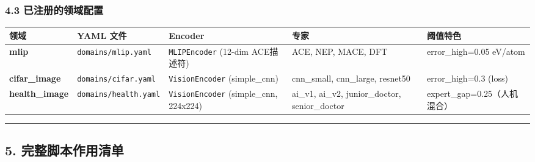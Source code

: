 \documentclass[
  12pt,
]{ctexart}
\begin{document}
\subsubsection{4.3
已注册的领域配置}\label{ux5df2ux6ce8ux518cux7684ux9886ux57dfux914dux7f6e}

\begin{longtable}[]{@{}
  >{\raggedright\arraybackslash}p{}
  >{\raggedright\arraybackslash}p{}
  >{\raggedright\arraybackslash}p{}
  >{\raggedright\arraybackslash}p{}
  >{\raggedright\arraybackslash}p{}@{}}
\toprule\noalign{}
\begin{minipage}[b]{\linewidth}\raggedright
领域
\end{minipage} & \begin{minipage}[b]{\linewidth}\raggedright
YAML 文件
\end{minipage} & \begin{minipage}[b]{\linewidth}\raggedright
Encoder
\end{minipage} & \begin{minipage}[b]{\linewidth}\raggedright
专家
\end{minipage} & \begin{minipage}[b]{\linewidth}\raggedright
阈值特色
\end{minipage} \\
\midrule\noalign{}
\endhead
\bottomrule\noalign{}
\endlastfoot
\textbf{mlip} & \texttt{domains/mlip.yaml} & \texttt{MLIPEncoder}
(12-dim ACE描述符) & ACE, NEP, MACE, DFT & error\_high=0.05 eV/atom \\
\textbf{cifar\_image} & \texttt{domains/cifar.yaml} &
\texttt{VisionEncoder} (simple\_cnn) & cnn\_small, cnn\_large, resnet50
& error\_high=0.3 (loss) \\
\textbf{health\_image} & \texttt{domains/health.yaml} &
\texttt{VisionEncoder} (simple\_cnn, 224x224) & ai\_v1, ai\_v2,
junior\_doctor, senior\_doctor & expert\_gap=0.25（人机混合） \\
\end{longtable}

\begin{center}\rule{0.5\linewidth}{0.5pt}\end{center}

\subsection{5.
完整脚本作用清单}\label{ux5b8cux6574ux811aux672cux4f5cux7528ux6e05ux5355}
\end{document}
